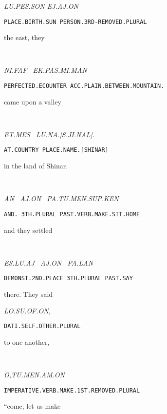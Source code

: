 {\lu\pes\son \comma  \ej\aj\on

{\it LU.PES.SON 	EJ.AJ.ON }

{\tt PLACE.BIRTH.SUN	PERSON.3RD-REMOVED.PLURAL }

the east, 		they 		 


\drie 


\Atlanni\faf~\ek\pas\mi\man

{\it NI.FAF~                                EK.PAS.MI.MAN }

{\tt PERFECTED.ECOUNTER  	ACC.PLAIN.BETWEEN.MOUNTAIN.	}

came upon 		a valley                 


\drie  


\et\mes~\lu\na\cartouche{\Atlans\ji\nal}\period

{\it ET.MES~		LU.NA.[S.JI.NAL]. }

{\tt AT.COUNTRY	PLACE.NAME.[SHINAR] }

in the land          of Shinar. 

\drie



\an~\aj\on~\pa\tu\men\Atlansup\ken

{\it AN~	AJ.ON~   PA.TU.MEN.SUP.KEN }

{\tt AND.	3TH.PLURAL	PAST.VERB.MAKE.SIT.HOME	 }

and 	they 		settled			 

\drie
  


\es\lu\aj~\period \aj\on~\pa\lan

{\it ES.LU.AJ~		AJ.ON~		PA.LAN	 }

{\tt DEMONST.2ND.PLACE	3TH.PLURAL	PAST.SAY }

there.			They		said 	 

\drie 


\lo\su\of\on\comma

{\it LO.SU.OF.ON, }

{\tt DATI.SELF.OTHER.PLURAL		 }
 
to one another, 			 
\drie 



  

\Atlano\tu\men\am\on\

{\it O,TU.MEN.AM.ON }

{\tt IMPERATIVE.VERB.MAKE.1ST.REMOVED.PLURAL }

“come, let us make   


\drie 


\ek\fuk\jet\on\comma\Atlani\an\

}
